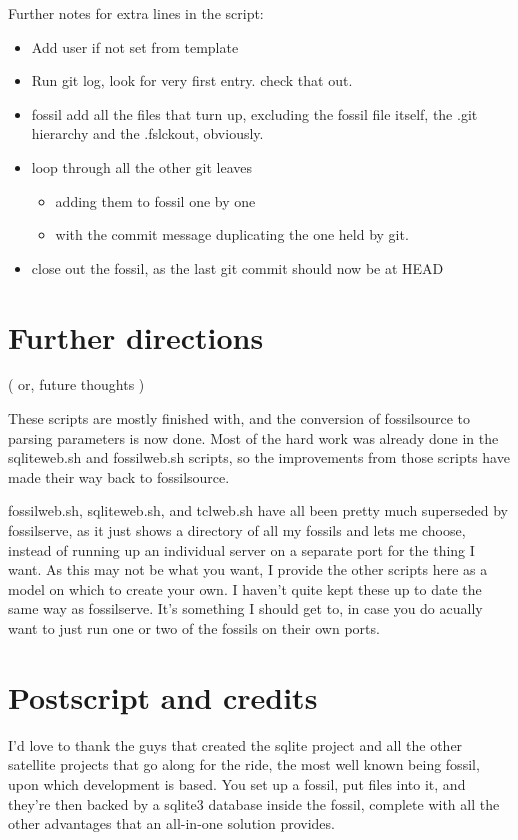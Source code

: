 \documentclass[11pt]{article}
\begin{document}
Further notes for extra lines in the script:
\begin{itemize}
\item Add user if not set from template
\item Run git log, look for very first entry. check that out.
\item fossil add all the files that turn up, excluding the fossil file itself, the .git hierarchy and the .fslckout, obviously.
\item loop through all the other git leaves
\begin{itemize}
\item adding them to fossil one by one
\item with the commit message duplicating the one held by git.
\end{itemize}
\item close out the fossil, as the last git commit should now be at HEAD
\end{itemize}

\section*{Further directions}
\label{sec:org0433889}

( or, future thoughts )

These scripts are mostly finished with, and the conversion of fossilsource to parsing parameters is
now done. Most of the hard work was already done in the sqliteweb.sh and fossilweb.sh scripts, so
the improvements from those scripts have made their way back to fossilsource.

fossilweb.sh, sqliteweb.sh, and tclweb.sh have all been pretty much superseded by fossilserve, as it
just shows a directory of all my fossils and lets me choose, instead of running up an individual
server on a separate port for the thing I want. As this may not be what you want, I provide the
other scripts here as a model on which to create your own. I haven't quite kept these up to date the
same way as fossilserve. It's something I should get to, in case you do acually want to just run one
or two of the fossils on their own ports.

\section*{Postscript and credits}
\label{sec:orgc6f6467}

I'd love to thank the guys that created the sqlite project and all the other satellite projects that
go along for the ride, the most well known being fossil, upon which development is based. You set up
a fossil, put files into it, and they're then backed by a sqlite3 database inside the fossil,
complete with all the other advantages that an all-in-one solution provides.
\end{document}
